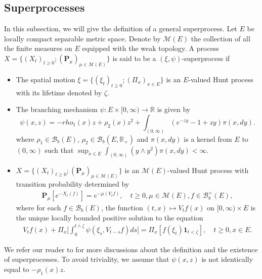 \documentclass[12pt,a4paper]{amsart}
\theoremstyle{plain}
\theoremstyle{definition}
\numberwithin{equation}{section}
\begin{document}
\subsection{Superprocesses}
\label{sec: definition of superprocess}
    In this subsection, we will give the definition of a general superprocess.
    Let $E$ be locally compact separable metric space. Denote by $\mathcal M(E)$ the collection of all the finite measures on $E$ equipped with the weak topology.
    A process $X=\{(X_t)_{t\geq 0}; (\mathbf P_\mu)_{\mu \in \mathcal M(E)}\}$ is said to be a $(\xi,\psi)$-superprocess if
\begin{itemize}
\item
    The spatial motion $\xi=\{(\xi_t)_{t\geq 0};(\Pi_x)_{x\in E}\}$ is an $E$-valued Hunt process with its lifetime denoted by $\zeta$.
\item
    The branching mechanism $\psi: E\times[0,\infty) \to \mathbb R$ is given by
\begin{equation}
\label{eq: branching mechanism}
    \psi(x,z)=
    -rho_1(x) z + \rho_2 (x) z^2 + \int_{(0,\infty)} (e^{-zy} - 1 + zy) \pi(x,dy).
\end{equation}
    where $\rho_1 \in \mathcal B_b(E)$, $\rho_2 \in \mathcal B_b(E, \mathbb R_+)$ and $\pi(x,dy)$ is a kernel from $E$ to $(0,\infty)$ such that $\sup_{x\in E} \int_{(0,\infty)} (y\wedge y^2) \pi(x,dy) < \infty$.
\item
    $X=\{(X_t)_{t\geq 0}; (\mathbf P_\mu)_{\mu \in \mathcal M(E)}\}$ is an $\mathcal M(E)$-valued Hunt process with transition probability determined by
\begin{equation}\begin{split}
    \mathbf P_\mu [e^{-X_t(f)}] = e^{-\mu(V_tf)},
    \quad t\geq 0, \mu \in \mathcal M(E), f\in \mathcal B^+_b(E),
\end{split}\end{equation}
    where for each $f\in \mathcal B_b(E)$, the function $(t,x)\mapsto V_tf(x)$ on $[0,\infty) \times E$ is the unique locally bounded positive solution to the equation
\begin{equation}\begin{split}\label{eq:FKPP_in_definition}
    V_tf(x) + \Pi_x \Big[  \int_0^{t\wedge \zeta} \psi(\xi_s,V_{t-s}f)ds \Big]
    = \Pi_x [ f(\xi_t)\mathbf 1_{t<\zeta} ],
    \quad t \geq 0, x \in E.
\end{split}\end{equation}
\end{itemize}
    We refer our reader to \cite{Li2011Measure-valued} for more discussions about the definition and the existence of superprocesses.
    To avoid triviality, we assume that 
    $\psi(x,z)$ is not identically equal to $-\rho_1(x)z$.
\end{document}
